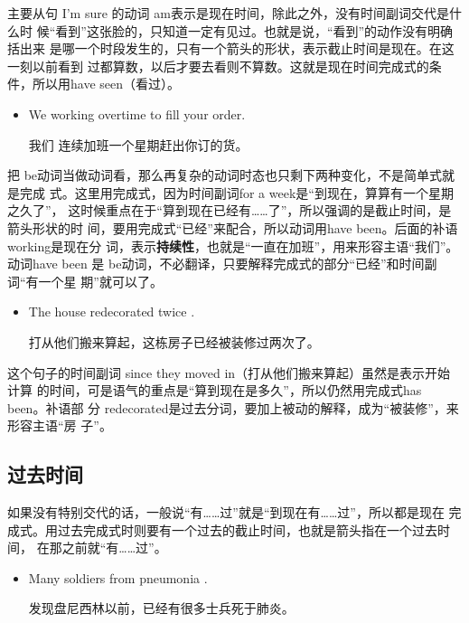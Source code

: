 主要从句 I'm sure 的动词 am表示是现在时间，除此之外，没有时间副词交代是什么时
候“看到”这张脸的，只知道一定有见过。也就是说，“看到”的动作没有明确括出来
是哪一个时段发生的，只有一个箭头的形状，表示截止时间是现在。在这一刻以前看到
过都算数，以后才要去看则不算数。这就是现在时间完成式的条件，所以用have
seen（看过）。

\begin{itemize}
\item We  working overtime  to fill your order.

我们
  连续加班一个星期赶出你订的货。
\end{itemize}

把 be动词当做动词看，那么再复杂的动词时态也只剩下两种变化，不是简单式就是完成
式。这里用完成式，因为时间副词for a week是“到现在，算算有一个星期之久了”，
这时候重点在于“算到现在已经有……了”，所以强调的是截止时间，是箭头形状的时
间，要用完成式“已经”来配合，所以动词用have been。后面的补语 working是现在分
词，表示\textbf{持续性}，也就是“一直在加班”，用来形容主语“我们”。动词have
been 是 be动词，不必翻译，只要解释完成式的部分“已经”和时间副词“有一个星
期”就可以了。

\begin{itemize}
\item  The house  redecorated twice .

  打从他们搬来算起，这栋房子已经被装修过两次了。
\end{itemize}

这个句子的时间副词 since they moved in（打从他们搬来算起）虽然是表示开始计算
的时间，可是语气的重点是“算到现在是多久”，所以仍然用完成式has been。补语部
分 redecorated是过去分词，要加上被动的解释，成为“被装修”，来形容主语“房
子”。

\subsection{过去时间}

如果没有特别交代的话，一般说“有……过”就是“到现在有……过”，所以都是现在
完成式。用过去完成式时则要有一个过去的截止时间，也就是箭头指在一个过去时间，
在那之前就“有……过”。

\begin{itemize}
\item  Many soldiers  from pneumonia .

  发现盘尼西林以前，已经有很多士兵死于肺炎。
\end{itemize}

